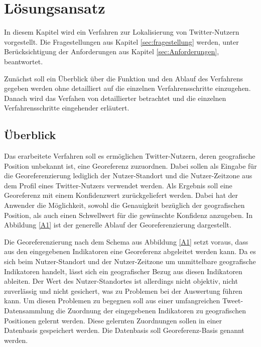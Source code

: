 \chapter{Lösungsansatz} \label{chp:Loesungsansatz}
In diesem Kapitel wird ein Verfahren zur Lokalisierung von Twitter-Nutzern vorgestellt.
Die Fragestellungen aus Kapitel \ref{sec:fragestellung} werden, unter Berücksichtigung der Anforderungen aus Kapitel \ref{sec:Anforderungen}, beantwortet.  

Zunächst soll ein Überblick über die Funktion und den Ablauf des Verfahrens gegeben werden ohne detailliert auf die einzelnen Verfahrensschritte einzugehen.
Danach wird das Verfahen von detaillierter betrachtet und die einzelnen Verfahrensschritte eingehender erläutert. 

	\section{Überblick} \label{sec:ueberblick} 

	Das erarbeitete Verfahren soll es ermöglichen Twitter-Nutzern, deren geografische Position unbekannt ist, eine Georeferenz zuzuordnen.
	Dabei sollen als Eingabe für die Georeferenzierung lediglich der Nutzer-Standort und die Nutzer-Zeitzone aus dem Profil eines Twitter-Nutzers verwendet werden.
	Als Ergebnis soll eine Georeferenz mit einem Konfidenzwert zurückgeliefert werden. 
	Dabei hat der Anwender die Möglichkeit, sowohl die Genauigkeit bezüglich der geografischen Position, als auch einen Schwellwert für die gewünschte Konfidenz anzugeben.
	In Abbildung \ref{A1} ist der generelle Ablauf der Georeferenzierung dargestellt. 
	\label{A1} 

	Die Georeferenzierung nach dem Schema aus Abbildung \ref{A1} setzt voraus, dass aus den eingegebenen Indikatoren eine Georeferenz abgeleitet werden kann.
	Da es sich beim Nutzer-Standort und der Nutzer-Zeitzone um unmittelbare geografische Indikatoren handelt, lässt sich ein geografischer Bezug aus diesen Indikatoren ableiten.      
	Der Wert des Nutzer-Standortes ist allerdings nicht objektiv, nicht zuverlässig und nicht gesichert, was zu Problemen bei der Auswertung führen kann.
	Um diesen Problemen zu begegnen soll aus einer umfangreichen Tweet-Datensammlung die Zuordnung der eingegebenen Indikatoren zu geografischen Positionen gelernt werden.
	Diese gelernten Zuordnungen sollen in einer Datenbasis gespeichert werden.
	Die Datenbasis soll Georeferenz-Basis genannt werden.
	
